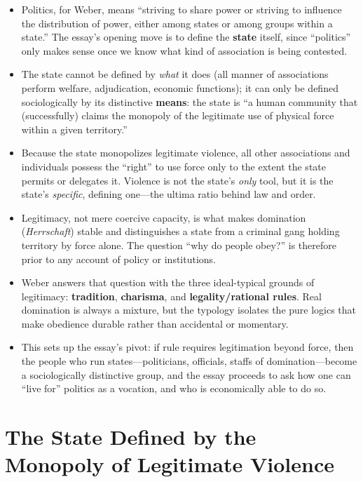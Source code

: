 \documentclass[12pt]{article}
\begin{document}
\begin{itemize}[leftmargin=*, itemsep=4pt]
    \item Politics, for Weber, means ``striving to share power or striving to influence the distribution of power, either among states or among groups within a state.'' The essay's opening move is to define the \textbf{state} itself, since ``politics'' only makes sense once we know what kind of association is being contested.
    \item The state cannot be defined by \emph{what} it does (all manner of associations perform welfare, adjudication, economic functions); it can only be defined sociologically by its distinctive \textbf{means}: the state is ``a human community that (successfully) claims the monopoly of the legitimate use of physical force within a given territory.''
    \item Because the state monopolizes legitimate violence, all other associations and individuals possess the ``right'' to use force only to the extent the state permits or delegates it. Violence is not the state's \emph{only} tool, but it is the state's \emph{specific}, defining one---the ultima ratio behind law and order.
    \item Legitimacy, not mere coercive capacity, is what makes domination (\textit{Herrschaft}) stable and distinguishes a state from a criminal gang holding territory by force alone. The question ``why do people obey?'' is therefore prior to any account of policy or institutions.
    \item Weber answers that question with the three ideal-typical grounds of legitimacy: \textbf{tradition}, \textbf{charisma}, and \textbf{legality/rational rules}. Real domination is always a mixture, but the typology isolates the pure logics that make obedience durable rather than accidental or momentary.
    \item This sets up the essay's pivot: if rule requires legitimation beyond force, then the people who run states---politicians, officials, staffs of domination---become a sociologically distinctive group, and the essay proceeds to ask how one can ``live for'' politics as a vocation, and who is economically able to do so.
\end{itemize}

\section{The State Defined by the Monopoly of Legitimate Violence}
\end{document}
